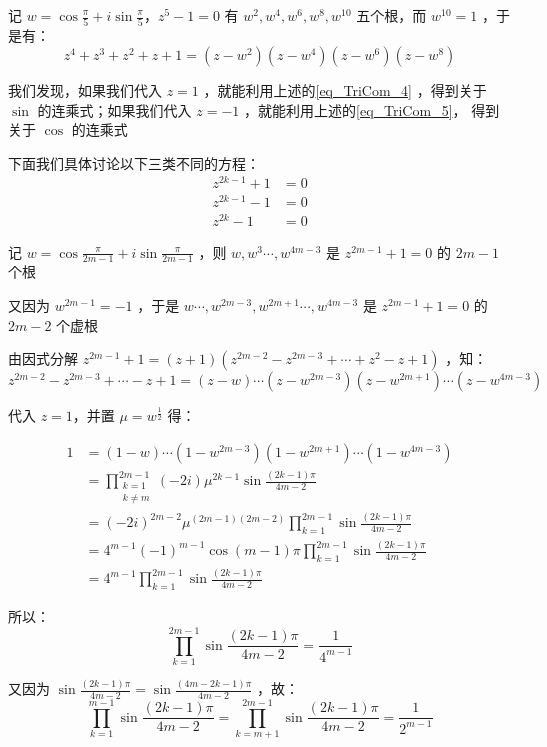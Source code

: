 记 $\displaystyle{w=\cos\frac{\pi}5+i\sin\frac{\pi}5}$，$z^5-1=0$ 有 $w^2,w^4,w^6,w^8,w^{10}$ 五个根，而 $w^{10}=1$ ，于是有：
$$z^4+z^3+z^2+z+1=(z-w^2)(z-w^4)(z-w^6)(z-w^8)$$

我们发现，如果我们代入 $z=1$ ，就能利用上述的\autoref{eq_TriCom_4}  ，得到关于 $\sin$ 的连乘式；如果我们代入 $z=-1$ ，就能利用上述的\autoref{eq_TriCom_5}， 得到关于 $\cos$ 的连乘式

下面我们具体讨论以下三类不同的方程：
$$\begin{aligned}
z^{2k-1}+1&=0\\z^{2k-1}-1&=0 \\z^{2k}-1&=0
\end{aligned}$$

记 $\displaystyle{w=\cos\frac{\pi}{2m-1}+i\sin\frac{\pi}{2m-1}}$ ，则 $w,w^3\cdots,w^{4m-3}$ 是 $z^{2m-1}+1=0$ 的 $2m-1$ 个根

又因为 $w^{2m-1}=-1$ ，于是 $w\cdots ,w^{2m-3},w^{2m+1}\cdots ,w^{4m-3}$ 是 $z^{2m-1}+1=0$ 的 $2m-2$ 个虚根

由因式分解 $z^{2m-1}+1=(z+1)(z^{2m-2}-z^{2m-3}+\cdots+z^{2}-z+1)$ ，知：
$$z^{2m-2}-z^{2m-3}+\cdots-z+1=(z-w)\cdots(z-w^{2m-3})(z-w^{2m+1})\cdots(z-w^{4m-3})$$

代入 $z=1$，并置 $\mu=w^{\frac12}$ 得：

$$\begin{aligned}
1&=(1-w)\cdots(1-w^{2m-3})(1-w^{2m+1})\cdots(1-w^{4m-3})\\&=\prod_{\substack{k=1\\k\neq m}}^{2m-1}(-2i)\mu^{2k-1}\sin\frac{(2k-1)\pi}{4m-2}\\&=(-2i)^{2m-2}{\mu}^{(2m-1)(2m-2)}\prod_{k=1}^{2m-1}\sin{\frac{(2k-1)\pi}{4m-2}}\\ &=4^{m-1}(-1)^{m-1}\cos(m-1)\pi\prod_{k=1}^{2m-1}\sin{\frac{(2k-1)\pi}{4m-2}}\\ &=4^{m-1}\prod_{k=1}^{2m-1}\sin{\frac{(2k-1)\pi}{4m-2}}  
\end{aligned}$$

所以： 
\begin{equation}%
\prod_{k=1}^{2m-1}\sin{\frac{(2k-1)\pi}{4m-2}}=\frac{1}{4^{m-1}}
\end{equation}

又因为 $\displaystyle{\sin\frac{(2k-1)\pi}{4m-2}=\sin\frac{(4m-2k-1)\pi}{4m-2}}$ ，故：
\begin{equation}%
\prod_{k=1}^{m-1}\sin{\frac{(2k-1)\pi}{4m-2}}=\prod_{k=m+1}^{2m-1}\sin{\frac{(2k-1)\pi}{4m-2}}=\frac{1}{2^{m-1}}
\end{equation}

